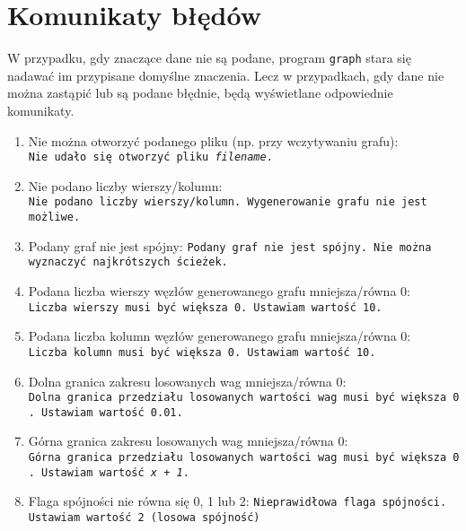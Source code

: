 \documentclass[]{article}
\begin{document}
\section{Komunikaty błędów}\label{header-n281}

W przypadku, gdy znaczące dane nie są podane, program \texttt{graph} stara się nadawać im przypisane domyślne znaczenia. Lecz w przypadkach, gdy dane nie można zastąpić lub są podane błędnie, będą wyświetlane odpowiednie komunikaty.

\begin{enumerate}
\def\labelenumi{\arabic{enumi}.}
\item
  Nie można otworzyć podanego pliku (np. przy wczytywaniu grafu):
  \texttt{Nie\ udało\ się\ otworzyć\ pliku\ \emph{filename}.}
\item
  Nie podano liczby wierszy/kolumn:
  \texttt{Nie\ podano\ liczby\ wierszy\texttt{/}kolumn.\ Wygenerowanie\ grafu nie jest możliwe. }
\item
  Podany graf nie jest spójny:
  \texttt{Podany\ graf\ nie\ jest\ spójny.\ Nie można wyznaczyć najkrótszych ścieżek.}
\item
  Podana liczba wierszy węzłów generowanego grafu mniejsza/równa 0:
  \texttt{Liczba\ wierszy\ musi\ być\ większa\ 0.\ Ustawiam\ wartość\ 10.}
\item
  Podana liczba kolumn węzłów generowanego grafu mniejsza/równa 0:
  \texttt{Liczba\ kolumn\ musi\ być\ większa\ 0.\ Ustawiam\ wartość\ 10.}
\item
  Dolna granica zakresu losowanych wag mniejsza/równa 0:
  \texttt{Dolna\ granica\ przedziału\ losowanych\ wartości\ wag\ musi\ być\ większa\ 0.\ Ustawiam\ wartość\ 0.01.}
\item
  Górna granica zakresu losowanych wag mniejsza/równa 0:
  \texttt{Górna\ granica\ przedziału\ losowanych\ wartości\ wag\ musi\ być\ większa\ 0.\ Ustawiam\ wartość\ \emph{x + 1}.}
\item 
    Flaga spójności nie równa się 0, 1 lub 2:
    \texttt{Nieprawidłowa flaga spójności. Ustawiam wartość 2 (losowa spójność)}
\end{enumerate}
\end{document}
